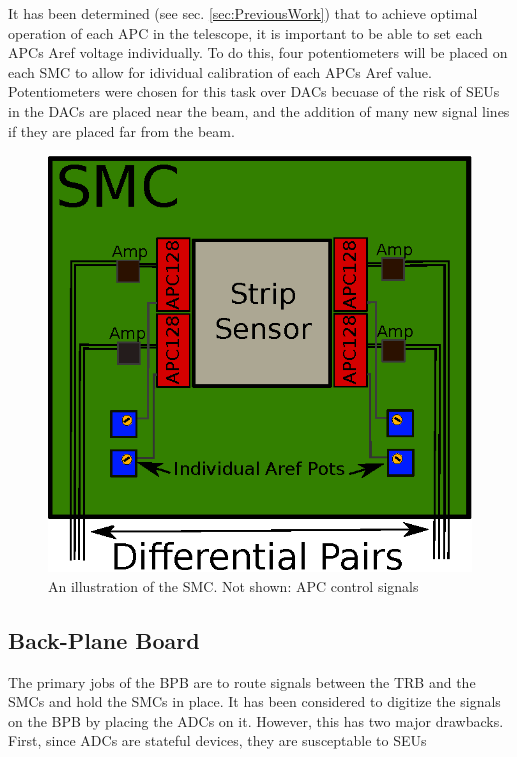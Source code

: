 \documentclass{article}
\begin{document}
It has been determined (see sec. \ref{sec:PreviousWork}) that to achieve optimal operation of each \gls{APC} in the telescope, it is important to be able to set each \gls{APC}s Aref voltage individually. To do this, four potentiometers will be placed on each SMC to allow for idividual calibration of each \gls{APC}s Aref value. Potentiometers were chosen for this task over DACs becuase of the risk of \gls{SEU}s in the DACs are placed near the beam, and the addition of many new signal lines if they are placed far from the beam.


\begin{figure}[h!]
  \centering
  \includegraphics{./figures/SMC.eps}
  \caption{An illustration of the \gls{SMC}. Not shown: \gls{APC} control signals}
  \label{fig:SMC}
\end{figure}


\subsection{Back-Plane Board}

The primary jobs of the \gls{BPB} are to route signals between the \gls{TRB} and the \gls{SMC}s and hold the \gls{SMC}s in place. It has been considered to digitize the signals on the \gls{BPB} by placing the ADCs on it. However, this has two major drawbacks. First, since ADCs are stateful devices, they are susceptable to \gls{SEU}s
\end{document}
